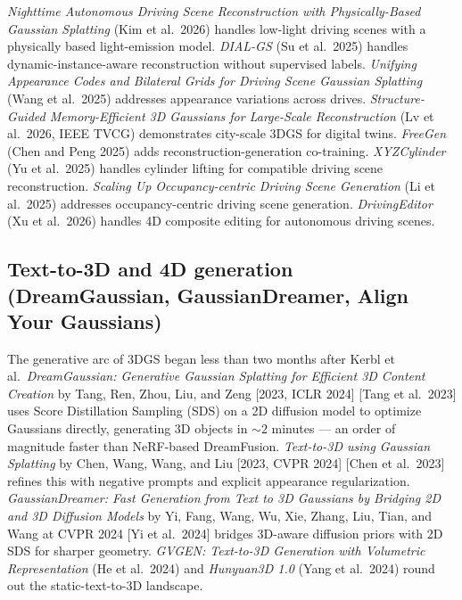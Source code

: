 \emph{Nighttime Autonomous Driving Scene Reconstruction with Physically-Based Gaussian Splatting} (Kim et al.~2026) handles low-light driving scenes with a physically based light-emission model. \emph{DIAL-GS} (Su et al.~2025) handles dynamic-instance-aware reconstruction without supervised labels. \emph{Unifying Appearance Codes and Bilateral Grids for Driving Scene Gaussian Splatting} (Wang et al.~2025) addresses appearance variations across drives. \emph{Structure-Guided Memory-Efficient 3D Gaussians for Large-Scale Reconstruction} (Lv et al.~2026, IEEE TVCG) demonstrates city-scale 3DGS for digital twins. \emph{FreeGen} (Chen and Peng 2025) adds reconstruction-generation co-training. \emph{XYZCylinder} (Yu et al.~2025) handles cylinder lifting for compatible driving scene reconstruction. \emph{Scaling Up Occupancy-centric Driving Scene Generation} (Li et al.~2025) addresses occupancy-centric driving scene generation. \emph{DrivingEditor} (Xu et al.~2026) handles 4D composite editing for autonomous driving scenes.

\subsection{Text-to-3D and 4D generation (DreamGaussian, GaussianDreamer, Align Your Gaussians)}\label{text-to-3d-and-4d-generation-dreamgaussian-gaussiandreamer-align-your-gaussians}

The generative arc of 3DGS began less than two months after Kerbl et al.~\emph{DreamGaussian: Generative Gaussian Splatting for Efficient 3D Content Creation} by Tang, Ren, Zhou, Liu, and Zeng {[}2023, ICLR 2024{]} {[}Tang et al.~2023{]} uses Score Distillation Sampling (SDS) on a 2D diffusion model to optimize Gaussians directly, generating 3D objects in \(\sim 2\) minutes --- an order of magnitude faster than NeRF-based DreamFusion. \emph{Text-to-3D using Gaussian Splatting} by Chen, Wang, Wang, and Liu {[}2023, CVPR 2024{]} {[}Chen et al.~2023{]} refines this with negative prompts and explicit appearance regularization. \emph{GaussianDreamer: Fast Generation from Text to 3D Gaussians by Bridging 2D and 3D Diffusion Models} by Yi, Fang, Wang, Wu, Xie, Zhang, Liu, Tian, and Wang at CVPR 2024 {[}Yi et al.~2024{]} bridges 3D-aware diffusion priors with 2D SDS for sharper geometry. \emph{GVGEN: Text-to-3D Generation with Volumetric Representation} (He et al.~2024) and \emph{Hunyuan3D 1.0} (Yang et al.~2024) round out the static-text-to-3D landscape.

